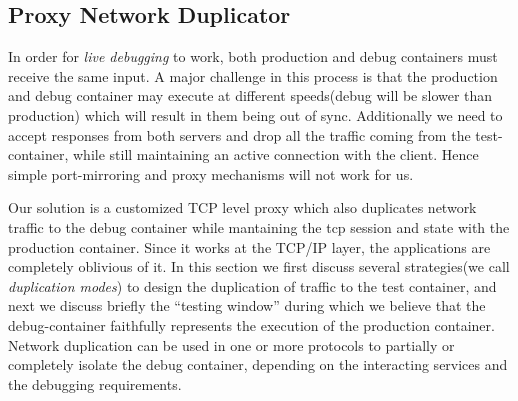 

\subsection{Proxy Network Duplicator} 
\label{sec:proxyDuplicator}

In order for \textit{live debugging} to work, both production and debug containers must receive the same input.
A major challenge in this process is that the production and debug container may execute at different speeds(debug will be slower than production) which will result in them being out of sync.
Additionally we need to accept responses from both servers and drop all the traffic coming from the test-container, while still maintaining an active connection with the client.
Hence simple port-mirroring and proxy mechanisms will not work for us.

Our solution is a customized TCP level proxy which also duplicates network traffic to the debug container while mantaining the tcp session and state with the production container. 
Since it works at the TCP/IP layer, the applications are completely oblivious of it.
In this section we first discuss several strategies(we call \textit{duplication modes}) to design the duplication of traffic to the test container, and next we discuss briefly the ``testing window'' during which we believe that the debug-container faithfully represents the execution of the production container. 
Network duplication can be used in one or more protocols to partially or completely isolate the debug container, depending on the interacting services and the debugging requirements.
%






